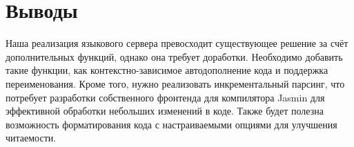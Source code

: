 \chapter{Выводы}
\label{chap:conclusion}

Наша реализация языкового сервера превосходит существующее решение за счёт
дополнительных функций, однако она требует доработки. Необходимо добавить такие
функции, как контекстно-зависимое автодополнение кода и поддержка
переименования. Кроме того, нужно реализовать инкрементальный парсинг, что
потребует разработки собственного фронтенда для компилятора Jasmin для
эффективной обработки небольших изменений в коде. Также будет полезна
возможность форматирования кода с настраиваемыми опциями для улучшения
читаемости.